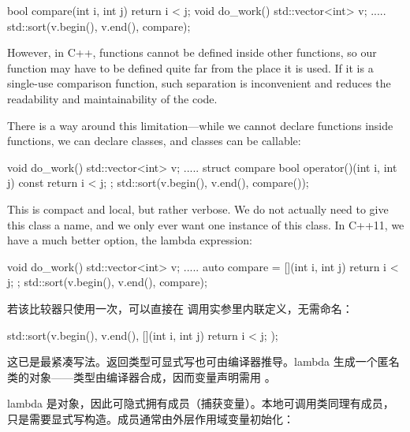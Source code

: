 \begin{code}
bool compare(int i, int j) { return i < j; }
void do_work() {
  std::vector<int> v;
  .....
  std::sort(v.begin(), v.end(), compare);
}
\end{code}

However, in C++, functions cannot be defined inside other functions, so our  function may have to be defined quite far from the place it is used. If it is a single-use comparison function, such separation is inconvenient and reduces the readability and maintainability of the code.

There is a way around this limitation---while we cannot declare functions inside functions, we can declare classes, and classes can be callable:

\begin{code}
void do_work() {
  std::vector<int> v;
  .....
  struct compare {
    bool operator()(int i, int j) const { return i < j; }
  };
  std::sort(v.begin(), v.end(), compare());
}
\end{code}

This is compact and local, but rather verbose. We do not actually need to give this class a name, and we only ever want one instance of this class. In C++11, we have a much better option, the lambda expression:

\begin{code}
void do_work() {
  std::vector<int> v;
  .....
  auto compare = [](int i, int j) { return i < j; };
  std::sort(v.begin(), v.end(), compare);
}
\end{code}

若该比较器只使用一次，可以直接在  调用实参里内联定义，无需命名：

\begin{code}
  std::sort(v.begin(), v.end(),
            [](int i, int j) { return i < j; });
\end{code}

这已是最紧凑写法。返回类型可显式写也可由编译器推导。lambda 生成一个匿名类的对象——类型由编译器合成，因而变量声明需用 。

lambda 是对象，因此可隐式拥有成员（捕获变量）。本地可调用类同理有成员，只是需要显式写构造。成员通常由外层作用域变量初始化：

